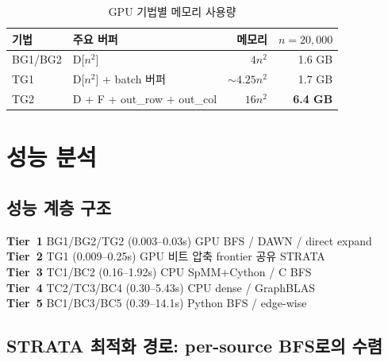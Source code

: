 \documentclass[11pt,a4paper]{article}
\begin{document}
\begin{table}[H]\centering
\caption{GPU 기법별 메모리 사용량}
\label{tab:memory}
\small
\begin{tabular}{@{}llrr@{}}
\toprule
\textbf{기법} & \textbf{주요 버퍼} & \textbf{메모리} & $n\!=\!20{,}000$ \\
\midrule
BG1/BG2 & D[$n^2$] & $4n^2$ & 1.6 GB \\
TG1 & D[$n^2$] + batch 버퍼 & $\sim 4.25n^2$ & 1.7 GB \\
\rowcolor{gridwarn!8} TG2 & D + F + out\_row + out\_col & $16n^2$ & \textbf{6.4 GB} \\
\bottomrule
\end{tabular}
\end{table}

\section{성능 분석}

\subsection{성능 계층 구조}

\begin{bluebox}[성능 계층 (전체 그래프 기준)]
\textbf{Tier~1} BG1/BG2/TG2 (0.003--0.03s) GPU BFS / DAWN / direct expand \\
\textbf{Tier~2} TG1 (0.009--0.25s) GPU 비트 압축 frontier 공유 STRATA \\
\textbf{Tier~3} TC1/BC2 (0.16--1.92s) CPU SpMM+Cython / C BFS \\
\textbf{Tier~4} TC2/TC3/BC4 (0.30--5.43s) CPU dense / GraphBLAS \\
\textbf{Tier~5} BC1/BC3/BC5 (0.39--14.1s) Python BFS / edge-wise
\end{bluebox}

\subsection{STRATA 최적화 경로: per-source BFS로의 수렴}
\end{document}
